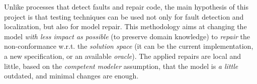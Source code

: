 \documentclass[
12pt, %
oneside, %
english, %
singlespacing, %
headsepline, %
consistentlayout, %
]{MastersDoctoralThesis} %
\theoremstyle{plain}
\theoremstyle{definition}
\theoremstyle{remark}
\theoremstyle{plain}
\theoremstyle{plain}
\theoremstyle{remark}
\begin{document}
Unlike processes that detect faults and repair code, %
the main hypothesis of this project is that testing techniques can be used not only for fault detection and localization, but also for model repair.
This methodology aims at changing the model \textit{with less impact as possible} (to preserve domain knowledge) to \textit{repair} the non-conformance w.r.t. the \textit{solution space} (it can be the current implementation, a new specification, or an available \textit{oracle}).
The applied repairs are local and little, based on the \textit{competent modeler} assumption, that the model is \textit{a little} outdated, and minimal changes are enough. 



\end{document}

